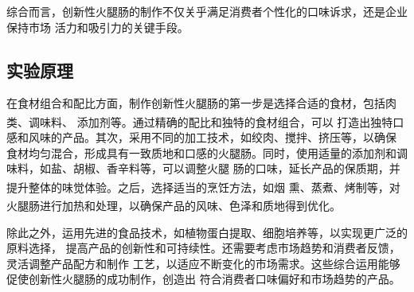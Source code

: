 \documentclass[UTF8]{ctexart}
\begin{document}
	综合而言，创新性火腿肠的制作不仅关乎满足消费者个性化的口味诉求，还是企业保持市场
	活力和吸引力的关键手段。

	\subsection{实验原理}


	在食材组合和配比方面，制作创新性火腿肠的第一步是选择合适的食材，包括肉类、调味料、
	添加剂等\textsuperscript{\cite{ref4}}。通过精确的配比和独特的食材组合，可以
	打造出独特口感和风味的产品。其次，采用不同的加工技术，如绞肉、搅拌、挤压等，以确保
	食材均匀混合，形成具有一致质地和口感的火腿肠。同时，使用适量的添加剂和调味料，如盐、胡椒、香辛料等，可以调整火腿
	肠的口味，延长产品的保质期，并提升整体的味觉体验\textsuperscript{\cite{ref5}}。之后，选择适当的烹饪方法，如烟
	熏、蒸煮、烤制等，对火腿肠进行加热和处理，以确保产品的风味、色泽和质地得到优化\textsuperscript{\cite{ref6}}。

	除此之外，运用先进的食品技术，如植物蛋白提取、细胞培养等，以实现更广泛的原料选择，
	提高产品的创新性和可持续性。还需要考虑市场趋势和消费者反馈，灵活调整产品配方和制作
	工艺，以适应不断变化的市场需求。这些综合运用能够促使创新性火腿肠的成功制作，创造出
	符合消费者口味偏好和市场趋势的产品。
\end{document}
